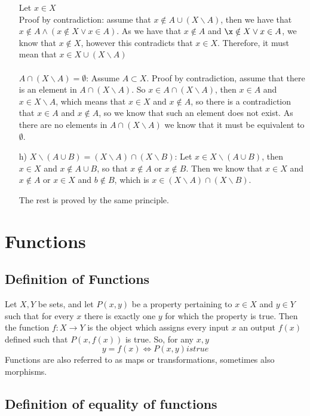 \begin{itemize}
		Let $x\in X$\\
		Proof by contradiction: assume  that $x\notin A\cup (X\backslash A)$, then we have that $x\notin A \wedge \left(x\notin X \vee x\in A\right)$. As we have that $x\notin A$ and $\x\notin X \vee x\in A$, we know that $x\notin X$, however this contradicts that $x\in X$. Therefore, it must mean that $x\in X\cup(X\backslash A)$\\\\
		$A\cap (X\backslash A) = \emptyset$: Assume $A\subset X$. Proof by contradiction, assume that there is an element in $A\cap (X\backslash A)$. So $x\in A\cap(X\backslash A)$, then $x\in A$ and $x\in X\backslash A$, which means that $x\in X$ and $x\notin A$, so there is a contradiction that $x\in A$ and $x\notin A$, so we know that such an element does not exist. As there are no elements in $A\cap(X\backslash A)$ we know that it must be equivalent to $\emptyset$.
		
	\item[h)] $X\backslash (A\cup B) = (X\backslash A)\cap (X\backslash B)$: Let $x\in X\backslash(A\cup B)$, then $x\in X$ and $x\notin A\cup B$, so that $x\notin A$ or $x\notin B$. Then we know that $x\in X$ and $x\notin A$ or $x\in X$ and $b \notin B$, which is $x\in (X\backslash A) \cap (X\backslash B)$.
	
	The rest is proved by the same principle.
\end{itemize}

\section{Functions}

\subsection{Definition of Functions}

Let $X,Y$ be sets, and let $P(x,y)$ be a property pertaining to $x\in X$ and $y\in Y$ such that for every $x$ there is exactly one $y$ for which the property is true. Then the function $f:X\rightarrow Y$ is the object which assigns every input $x$ an output $f(x)$ defined such that $P(x,f(x))$ is true. So, for any $x,y$
$$
y = f(x) \Leftrightarrow P(x,y) is true
$$
Functions are also referred to as maps or transformations, sometimes also morphisms.

\subsection{Definition of equality of functions}

